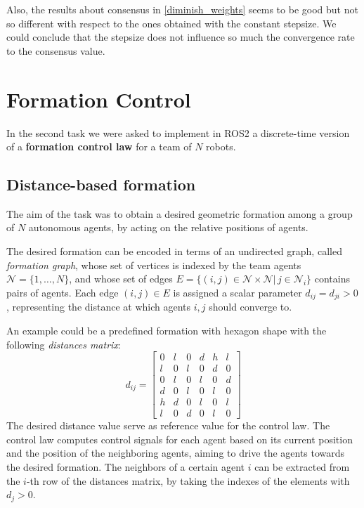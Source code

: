 \documentclass[a4paper,11pt,oneside]{book}
\begin{document}
Also, the results about consensus in \ref{diminish_weights} seems to be good but not so different with respect to the ones obtained with the constant stepsize. We could conclude that the stepsize does not influence so much the convergence rate to the consensus value.


\chapter{Formation Control} 
 In the second task we were asked to implement in ROS2 a discrete-time version of a \textbf{formation control law} for a team of $N$ robots.

\section{Distance-based formation}
The aim of the task was to obtain a desired geometric formation among a group of $N$ autonomous agents, by acting on the relative positions of agents.

\bigskip
The desired formation can be encoded in terms of an undirected graph, called \textit{formation graph}, whose set of vertices is indexed by the team agents $\mathcal{N} =\{ 1, \ldots, N\}$, and whose set of edges $E=\{(i,j) \in \mathcal{N} \times \mathcal{N} | \, j \in \mathcal{N}_i\}$ contains pairs of agents. Each edge $(i,j) \in E$ is assigned a scalar parameter $d_{ij} = d_{ji} > 0$, representing the distance at which agents $i,j$ should converge to. 

An example could be a predefined formation with hexagon shape with the following \textit{distances matrix}:
\begin{equation}
d_{ij} =
\begin{bmatrix}
0 & l & 0 & d & h & l \\
l & 0 & l & 0 & d & 0 \\
0 & l & 0 & l & 0 & d \\
d & 0 & l & 0 & l & 0 \\
h & d & 0 & l & 0 & l \\
l & 0 & d & 0 & l & 0
\end{bmatrix}
\end{equation}
The desired distance value serve as reference value for the control law. The control law computes control signals for each agent based on its current position and the position of the neighboring agents, aiming to drive the agents towards the desired formation.
The neighbors of a certain agent $i$ can be extracted from the $i$-th row of the distances matrix, by taking the indexes of the elements with $d_j > 0$.
\end{document}
